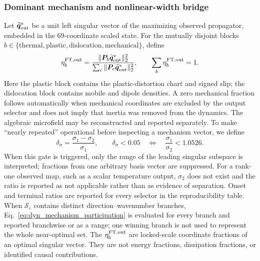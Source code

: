 \subsubsection{Dominant mechanism and nonlinear-width bridge}

Let $\widetilde{\boldsymbol q}_{\rm out}^*$ be a unit left singular vector of
the maximizing observed propagator, embedded in the 69-coordinate scaled
state.  For the mutually disjoint blocks
$b\in\{\mathrm{thermal},\mathrm{plastic},\mathrm{dislocation},
\mathrm{mechanical}\}$, define
\begin{equation}
 \eta_b^{\rm FT,out}
 =\frac{\|\boldsymbol P_b\widetilde{\boldsymbol q}_{\rm out}^*\|_2^2}
 {\sum_c\|\boldsymbol P_c\widetilde{\boldsymbol q}_{\rm out}^*\|_2^2},
 \qquad \sum_b\eta_b^{\rm FT,out}=1.
 \label{eq:dyn_mechanism_participation}
\end{equation}
Here the plastic block contains the plastic-distortion chart and signed slip;
the dislocation block contains mobile and dipole densities.  A zero mechanical
fraction follows automatically when mechanical coordinates are excluded by the
output selector and does not imply that inertia was removed from the dynamics.
The algebraic microfield may be reconstructed and reported separately.  To
make ``nearly repeated'' operational before inspecting a mechanism vector, we
define
\begin{equation}
 \delta_\sigma=\frac{\sigma_1-\sigma_2}{\sigma_1},\qquad
 \delta_\sigma<0.05
 \quad\Longleftrightarrow\quad
 \frac{\sigma_1}{\sigma_2}<1.0526 .
 \label{eq:dyn_singular_degeneracy_gate}
\end{equation}
When this gate is triggered, only the range of the leading singular subspace
is interpreted; fractions from one arbitrary basis vector are suppressed.
For a rank-one observed map, such as a scalar temperature output, $\sigma_2$
does not exist and the ratio is reported as not applicable rather than as
evidence of separation.  Onset and terminal ratios are reported for every
selector in the reproducibility table.
When $\mathcal S_\varepsilon$ contains distinct direction--wavenumber branches,
Eq.~\eqref{eq:dyn_mechanism_participation} is evaluated for every branch and
reported branchwise or as a range; one winning branch is not used to represent
the whole near-optimal set.
The $\eta_b^{\rm FT,out}$ are locked-scale coordinate fractions of an optimal singular
vector.  They are not energy fractions, dissipation fractions, or identified
causal contributions.

